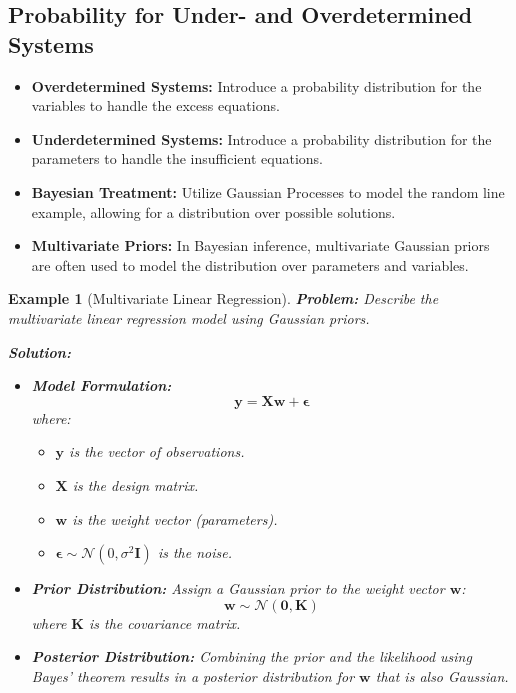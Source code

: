 \documentclass[12pt]{article}
\newtheorem{example}{Example}
\begin{document}
\subsection{Probability for Under- and Overdetermined Systems}
\begin{itemize}
    \item \textbf{Overdetermined Systems:} Introduce a probability distribution for the variables to handle the excess equations.
    \item \textbf{Underdetermined Systems:} Introduce a probability distribution for the parameters to handle the insufficient equations.
    \item \textbf{Bayesian Treatment:} Utilize Gaussian Processes to model the random line example, allowing for a distribution over possible solutions.
    \item \textbf{Multivariate Priors:} In Bayesian inference, multivariate Gaussian priors are often used to model the distribution over parameters and variables.
\end{itemize}

\begin{example}[Multivariate Linear Regression]
    \textbf{Problem:} Describe the multivariate linear regression model using Gaussian priors.
    
    \textbf{Solution:}
    \begin{itemize}
        \item \textbf{Model Formulation:}
        \[
        \mathbf{y} = \mathbf{X} \mathbf{w} + \boldsymbol{\epsilon}
        \]
        where:
        \begin{itemize}
            \item \( \mathbf{y} \) is the vector of observations.
            \item \( \mathbf{X} \) is the design matrix.
            \item \( \mathbf{w} \) is the weight vector (parameters).
            \item \( \boldsymbol{\epsilon} \sim \mathcal{N}(0, \sigma^2 \mathbf{I}) \) is the noise.
        \end{itemize}
        \item \textbf{Prior Distribution:} Assign a Gaussian prior to the weight vector \( \mathbf{w} \):
        \[
        \mathbf{w} \sim \mathcal{N}(\mathbf{0}, \mathbf{K})
        \]
        where \( \mathbf{K} \) is the covariance matrix.
        \item \textbf{Posterior Distribution:} Combining the prior and the likelihood using Bayes' theorem results in a posterior distribution for \( \mathbf{w} \) that is also Gaussian.
    \end{itemize}
\end{example}
\end{document}

